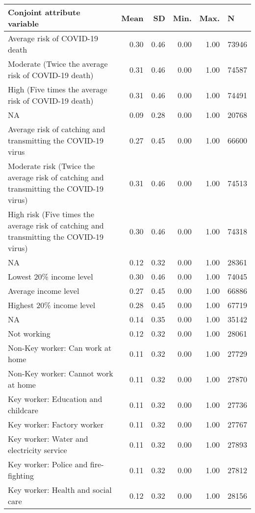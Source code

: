 \begin{sidewaystable}[ht]
\centering
\begin{tabular}{lrrrrl}
  \hline
Conjoint attribute variable & Mean & SD & Min. & Max. & N \\ 
  \hline
Average risk of COVID-19 death & 0.30 & 0.46 & 0.00 & 1.00 & 73946 \\ 
  Moderate (Twice the average risk of COVID-19 death) & 0.31 & 0.46 & 0.00 & 1.00 & 74587 \\ 
  High (Five times the average risk of COVID-19 death) & 0.31 & 0.46 & 0.00 & 1.00 & 74491 \\ 
  NA & 0.09 & 0.28 & 0.00 & 1.00 & 20768 \\ 
  Average risk of catching and transmitting the COVID-19 virus & 0.27 & 0.45 & 0.00 & 1.00 & 66600 \\ 
  Moderate risk (Twice the average risk of catching and transmitting the COVID-19 virus) & 0.31 & 0.46 & 0.00 & 1.00 & 74513 \\ 
  High risk (Five times the average risk of catching and transmitting the COVID-19 virus) & 0.30 & 0.46 & 0.00 & 1.00 & 74318 \\ 
  NA & 0.12 & 0.32 & 0.00 & 1.00 & 28361 \\ 
  Lowest 20\% income level & 0.30 & 0.46 & 0.00 & 1.00 & 74045 \\ 
  Average income level & 0.27 & 0.45 & 0.00 & 1.00 & 66886 \\ 
  Highest 20\% income level & 0.28 & 0.45 & 0.00 & 1.00 & 67719 \\ 
  NA & 0.14 & 0.35 & 0.00 & 1.00 & 35142 \\ 
  Not working & 0.12 & 0.32 & 0.00 & 1.00 & 28061 \\ 
  Non-Key worker: Can work at home & 0.11 & 0.32 & 0.00 & 1.00 & 27729 \\ 
  Non-Key worker: Cannot work at home & 0.11 & 0.32 & 0.00 & 1.00 & 27870 \\ 
  Key worker: Education and childcare & 0.11 & 0.32 & 0.00 & 1.00 & 27736 \\ 
  Key worker: Factory worker & 0.11 & 0.32 & 0.00 & 1.00 & 27767 \\ 
  Key worker: Water and electricity service & 0.11 & 0.32 & 0.00 & 1.00 & 27893 \\ 
  Key worker: Police and fire-fighting & 0.11 & 0.32 & 0.00 & 1.00 & 27812 \\ 
  Key worker: Health and social care & 0.12 & 0.32 & 0.00 & 1.00 & 28156 \\ 

\end{tabular}
\end{sidewaystable}
